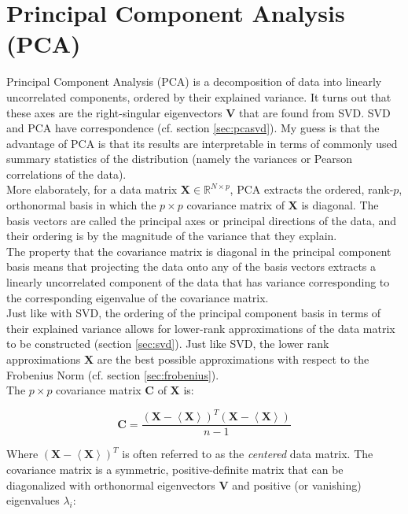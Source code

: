 \section{Principal Component Analysis (PCA)}
\label{sec:pca}

Principal Component Analysis (PCA) is a decomposition of data into linearly uncorrelated components, ordered by their explained variance. It turns out that these axes are the right-singular eigenvectors $\mathbf{V}$ that are found from SVD. SVD and PCA have correspondence (cf. section \ref{sec:pcasvd}). My guess is that the advantage of PCA is that its results are interpretable in terms of commonly used summary statistics of the distribution (namely the variances or Pearson correlations of the data).
\\

More elaborately, for a data matrix $\mathbf{X}\in\mathbb{R}^{N\times p}$, PCA extracts the ordered, rank-$p$, orthonormal basis in which the $p\times p$ covariance matrix of $\mathbf{X}$ is diagonal. The basis vectors are called the principal axes or principal directions of the data, and their ordering is by the magnitude of the variance that they explain. 
\\

The property that the covariance matrix is diagonal in the principal component basis means that projecting the data onto any of the basis vectors extracts a linearly uncorrelated component of the data that has variance corresponding to the corresponding eigenvalue of the covariance matrix.
\\

Just like with SVD, the ordering of the principal component basis in terms of their explained variance allows for lower-rank approximations of the data matrix to be constructed (section \ref{sec:svd}). Just like SVD, the lower rank approximations $\mathbf{X}$ are the best possible approximations with respect to the Frobenius Norm (cf. section \ref{sec:frobenius}). 
\\

The $p\times p$ covariance matrix  $\mathbf{C}$ of $\mathbf{X}$ is:

\begin{equation}
\mathbf{C} = \frac{\left(\mathbf{X}-\left<\mathbf{X}\right>\right)^T\left(\mathbf{X}-\left< \mathbf{X}\right>\right)}{n-1}
\end{equation}

Where $\left(\mathbf{X}-\left<\mathbf{X}\right>\right)^T$ is often referred to as the \textit{centered} data matrix. The covariance matrix is a symmetric, positive-definite matrix that can be diagonalized with orthonormal eigenvectors $\mathbf{V}$ and positive (or vanishing) eigenvalues $\lambda_i$:

